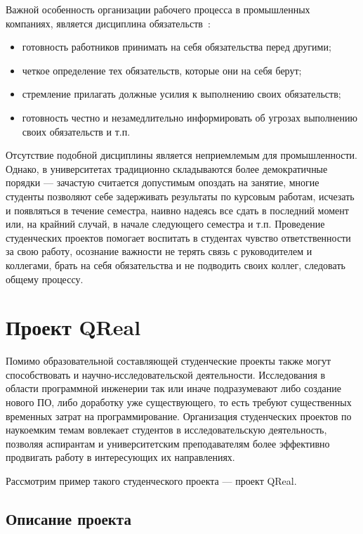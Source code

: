 \documentclass[a4paper]{article}
\begin{document}
Важной особенность организации рабочего процесса в промышленных компаниях, является дисциплина обязательств~\cite{obyzat}:
\begin{itemize}
 \item готовность работников принимать на себя обязательства перед другими;
 \item четкое определение тех обязательств, которые они на себя берут;
 \item стремление прилагать должные усилия к выполнению своих обязательств;
 \item готовность честно и незамедлительно информировать об угрозах выполнению своих обязательств и т.п.
\end{itemize}
Отсутствие подобной дисциплины является неприемлемым для промышленности. Однако, в университетах традиционно складываются более демократичные порядки --- зачастую считается допустимым опоздать на занятие, многие студенты позволяют себе задерживать результаты по курсовым работам, исчезать и появляться в течение семестра, наивно надеясь все сдать в последний момент или, на крайний случай, в начале следующего семестра и т.п. Проведение студенческих проектов помогает воспитать в студентах чувство ответственности за свою работу, осознание важности не терять связь с руководителем и коллегами, брать на себя обязательства и не подводить своих коллег, следовать общему процессу.

\section{Проект QReal}

Помимо образовательной составляющей студенческие проекты также могут способствовать и научно-исследовательской деятельности. Исследования в области программной инженерии так или иначе подразумевают либо создание нового ПО, либо доработку уже существующего, то есть требуют существенных временных затрат на программирование. Организация студенческих проектов по наукоемким темам вовлекает студентов в исследовательскую деятельность, позволяя аспирантам и университетским преподавателям более эффективно продвигать работу в интересующих их направлениях.  

Рассмотрим пример такого студенческого проекта --- проект QReal. 

\subsection{Описание проекта}
\end{document}
